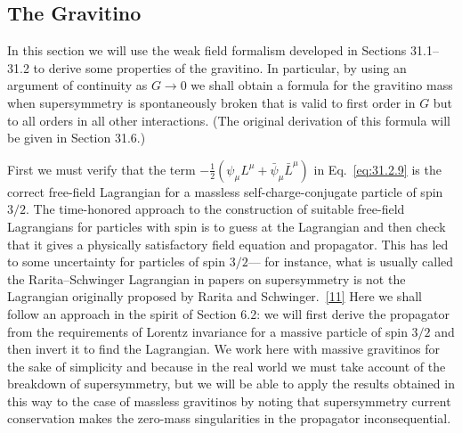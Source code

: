 
\subsection{The Gravitino}

In this section we will use the weak field formalism developed in Sections
31.1--31.2 to derive some properties of the gravitino. In particular, by
using an argument of continuity as \(G\to0\) we shall obtain a formula for
the gravitino mass when supersymmetry is spontaneously broken that is valid
to first order in \(G\) but to all orders in all other interactions. (The
original derivation of this formula will be given in Section 31.6.)

First we must verify that the term
\(-\frac12(\psi_\mu L^\mu+\bar\psi_\mu\bar L^\mu)\) in
Eq.~\eqref{eq:31.2.9} is the correct
free-field Lagrangian for a massless self-charge-conjugate particle of spin
\(3/2\). The time-honored approach to the construction of suitable
free-field Lagrangians for particles with spin is to guess at the Lagrangian
and then check that it gives a physically satisfactory field equation and
propagator. This has led to some uncertainty for particles of spin \(3/2\)---
for instance, what is usually called the Rarita--Schwinger Lagrangian in
papers on supersymmetry is not the Lagrangian originally proposed by Rarita
and Schwinger.~\hyperref[ch31-ref-11]{[11]} Here we shall follow an approach
in the spirit of Section 6.2: we will first derive the propagator from the
requirements of Lorentz invariance for a massive particle of spin \(3/2\)
and then invert it to find the Lagrangian. We work here with massive
gravitinos for the sake of simplicity and because in the real world we must
take account of the breakdown of supersymmetry, but we will be able to apply
the results obtained in this way to the case of massless gravitinos by
noting that supersymmetry current conservation makes the zero-mass
singularities in the propagator inconsequential.


